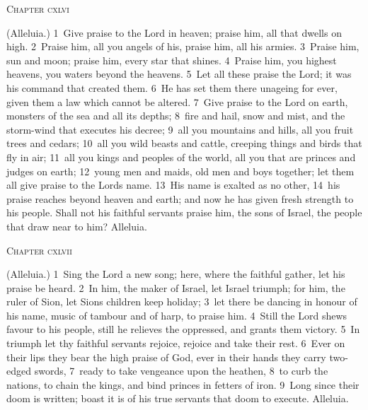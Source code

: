 \documentclass[10pt]{book} %
\begin{document}
\begin{large}\begin{center}\textsc{Chapter cxlvi}\end{center}\end{large}
(Alleluia.)
\textcolor{benred8}{1}~Give praise to the Lord in heaven; praise him, all that dwells on high. \textcolor{benred8}{2}~Praise him, all you angels of his, praise him, all his armies. \textcolor{benred8}{3}~Praise him, sun and moon; praise him, every star that shines. \textcolor{benred8}{4}~Praise him, you highest heavens, you waters beyond the heavens. \textcolor{benred8}{5}~Let all these praise the Lord; it was his command that created them. \textcolor{benred8}{6}~He has set them there unageing for ever, given them a law which cannot be altered.
\textcolor{benred8}{7}~Give praise to the Lord on earth, monsters of the sea and all its depths; \textcolor{benred8}{8}~fire and hail, snow and mist, and the storm-wind that executes his decree; \textcolor{benred8}{9}~all you mountains and hills, all you fruit trees and cedars; \textcolor{benred8}{10}~all you wild beasts and cattle, creeping things and birds that fly in air; \textcolor{benred8}{11}~all you kings and peoples of the world, all you that are princes and judges on earth; \textcolor{benred8}{12}~young men and maids, old men and boys together; let them all give praise to the Lord\textquotesingle s name. \textcolor{benred8}{13}~His name is exalted as no other, \textcolor{benred8}{14}~his praise reaches beyond heaven and earth; and now he has given fresh strength to his people. Shall not his faithful servants praise him, the sons of Israel, the people that draw near to him? Alleluia.
\begin{large}\begin{center}\textsc{Chapter cxlvii}\end{center}\end{large}
(Alleluia.)
\textcolor{benred8}{1}~Sing the Lord a new song; here, where the faithful gather, let his praise be heard. \textcolor{benred8}{2}~In him, the maker of Israel, let Israel triumph; for him, the ruler of Sion, let Sion\textquotesingle s children keep holiday; \textcolor{benred8}{3}~let there be dancing in honour of his name, music of tambour and of harp, to praise him. \textcolor{benred8}{4}~Still the Lord shews favour to his people, still he relieves the oppressed, and grants them victory. \textcolor{benred8}{5}~In triumph let thy faithful servants rejoice, rejoice and take their rest. \textcolor{benred8}{6}~Ever on their lips they bear the high praise of God, ever in their hands they carry two-edged swords, \textcolor{benred8}{7}~ready to take vengeance upon the heathen, \textcolor{benred8}{8}~to curb the nations, to chain the kings, and bind princes in fetters of iron. \textcolor{benred8}{9}~Long since their doom is written; boast it is of his true servants that doom to execute. Alleluia.
\end{document}
